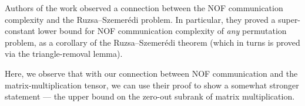 \documentclass[10pt,a4paper]{article}
\newcommand{\bZ}{\mathbb{Z}}
\newcommand{\eval}{\textsc{Eval}}
\newcommand{\Oh}{\mathcal{O}}
\newcommand{\inprod}[1]{\langle #1 \rangle}
\newcommand{\jnote}[1]{\todo[inline, color=blue!30!white]{#1 \\ -\textsc{Jarek}}}
\begin{document}
Authors of the work \cite{LPS17} observed a connection between the NOF communication complexity and the Ruzsa–Szemerédi problem. In particular, they proved a super-constant lower bound for NOF communication complexity of \emph{any} permutation problem, as a corollary of the Ruzsa–Szemerédi theorem (which in turns is proved via the triangle-removal lemma).


Here, we observe that with our connection between NOF communication and the matrix-multiplication tensor, we can use their proof to show a somewhat stronger statement --- the upper bound on the zero-out subrank of matrix multiplication.


\end{document}
